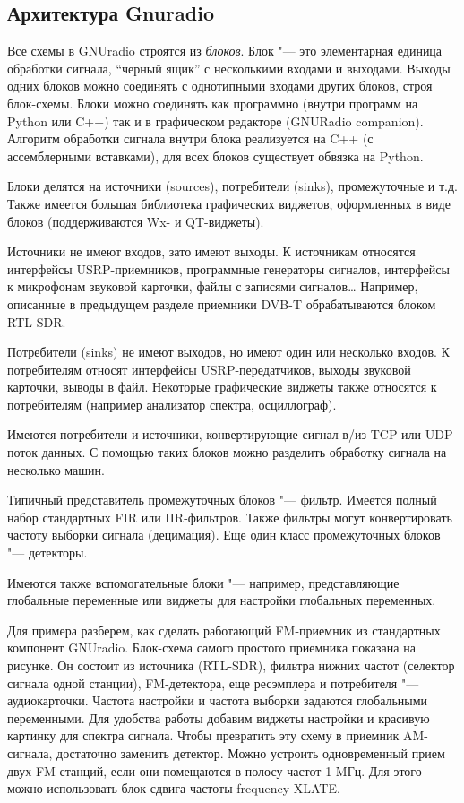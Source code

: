 \documentclass[10pt, a5paper]{article}
\begin{document}
\subsection*{Архитектура Gnuradio}

Все схемы в GNUradio строятся из \emph{блоков}. Блок "--- это элементарная единица обработки сигнала, ``черный ящик'' с несколькими входами и выходами. Выходы одних блоков можно соединять с однотипными входами других блоков, строя блок-схемы. Блоки можно соединять как программно (внутри программ на Python или C++) так и в графическом редакторе (GNURadio companion). Алгоритм обработки сигнала внутри блока реализуется на C++ (с ассемблерными вставками), для всех блоков существует обвязка на Python.

Блоки делятся на источники (sources), потребители (sinks), промежуточные и т.д. Также имеется большая библиотека графических виджетов, оформленных в виде блоков (поддерживаются Wx- и QT-виджеты).

Источники не имеют входов, зато имеют выходы. К источникам относятся интерфейсы USRP-приемников, программные генераторы сигналов, интерфейсы к микрофонам звуковой карточки, файлы с записями сигналов\ldots{} Например, описанные в предыдущем разделе приемники DVB-T  обрабатываются блоком RTL-SDR.

Потребители (sinks) не имеют выходов, но имеют один или несколько входов. К потребителям относят интерфейсы USRP-передатчиков, выходы звуковой карточки, выводы в файл. Некоторые графические виджеты также относятся к потребителям (например анализатор спектра, осциллограф).

Имеются потребители и источники, конвертирующие сигнал в/из TCP или UDP-поток данных. С помощью таких блоков можно разделить обработку сигнала на несколько машин.

Типичный представитель промежуточных блоков "--- фильтр. Имеется полный набор стандартных FIR или IIR-фильтров. Также фильтры могут конвертировать частоту выборки сигнала (децимация). Еще один класс промежуточных блоков "--- детекторы.

Имеются также вспомогательные блоки "--- например, представляющие глобальные переменные или виджеты для настройки глобальных переменных.

Для примера разберем, как сделать работающий FM-приемник из стандартных компонент GNUradio. Блок-схема самого простого приемника показана на рисунке.  Он состоит из источника (RTL-SDR), фильтра нижних частот (селектор сигнала одной станции), FM-детектора, еще ресэмплера и потребителя "--- аудиокарточки. Частота настройки и частота выборки задаются глобальными переменными. Для удобства работы добавим виджеты настройки и красивую картинку для спектра сигнала. Чтобы превратить эту схему в приемник AM-сигнала, достаточно заменить детектор. Можно устроить одновременный прием двух FM станций, если они помещаются в полосу частот 1 MГц. Для этого можно использовать блок сдвига частоты frequency XLATE.
\end{document}
